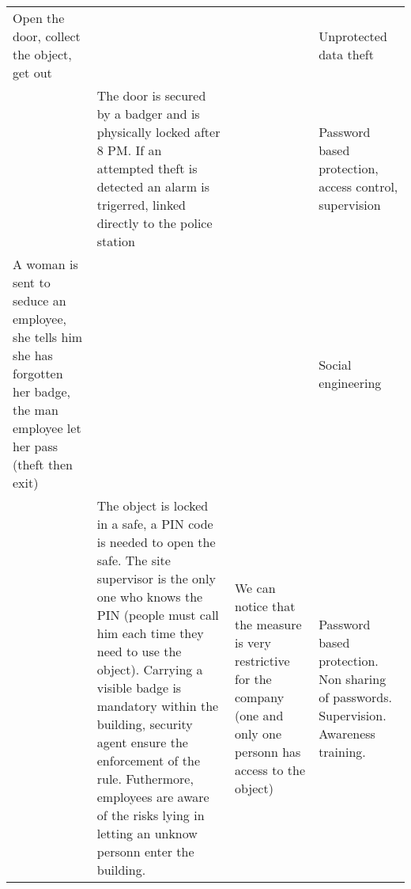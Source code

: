 \documentclass[11pt]{article} %
\begin{document}
\begin{longtable}{|p{3cm}|p{3cm}|p{3cm}|p{3cm}|}
Open the door, collect the object, get out & & & Unprotected data theft \\
& The door is secured by a badger and is physically locked after 8 PM. 
If an attempted theft is detected an alarm is trigerred, linked directly to the 
police station & & Password based protection, access control, supervision \\
A woman is sent to seduce an employee, she tells him she has forgotten her badge,
the man employee let her pass (theft then exit) & & & Social engineering \\
& The object is locked in a safe, a PIN code is needed to open the safe. The 
site supervisor is the only one who knows the PIN (people must call him each time
they need to use the object). Carrying a visible badge is mandatory within the building,
security agent ensure the enforcement of the rule. Futhermore, employees
are aware of the risks lying in letting an unknow personn enter the building.
& We can notice that the measure is very restrictive for the company (one and 
only one personn has access to the object) & Password based protection. Non
sharing of passwords. Supervision. Awareness training.\\

\end{longtable}
\end{document}
